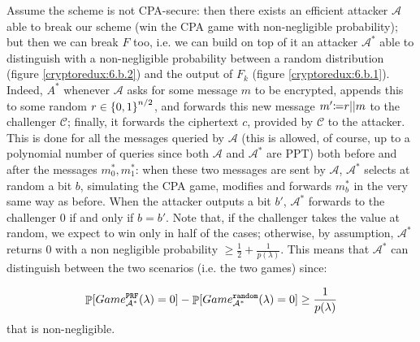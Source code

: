 \begin{enumerate}[(a)]
\begin{solution}
		      Assume the scheme is not CPA-secure: then there exists an efficient attacker $\mathcal{A}$ able to break our scheme (win the CPA game with non-negligible probability); but then we can break $F$ too, i.e. we can build on top of it an attacker $\mathcal{A}^*$ able to distinguish with a non-negligible probability between a random distribution (figure \ref{cryptoredux:6.b.2}) and the output of $F_k$ (figure \ref{cryptoredux:6.b.1}). Indeed, $A^*$ whenever $\mathcal{A}$ asks for some message $m$ to be encrypted, appends this to some random $r \in \bits^{n/2}$, and forwards this new message $m'\deq r||m$ to the challenger $\mathcal{C}$; finally, it forwards the ciphertext $c$, provided by $\mathcal{C}$ to the attacker. This is done for all the messages queried by $\mathcal{A}$ (this is allowed, of course, up to a polynomial number of queries since both $\mathcal{A}$ and $\mathcal{A}^*$ are PPT) both before and after the messages $m_0^*, m_1^*$: when these two messages are sent by $\mathcal{A}$, $\mathcal{A}^*$ selects at random a bit $b$, simulating the CPA game, modifies and forwards $m_b^*$ in the very same way as before. When the attacker outputs a bit $b'$, $\mathcal{A}^*$ forwards to the challenger 0 if and only if $b = b'$. Note that, if the challenger takes the value at random, we expect to win only in half of the cases; otherwise, by assumption, $\mathcal{A}^*$ returns 0 with a non negligible probability $\ge \frac{1}{2} + \frac{1}{p(\lambda)}$. This means that $\mathcal{A}^*$ can distinguish between the two scenarios (i.e. the two games) since:

		      \[\P[Game_{\mathcal{A}^*}^{\texttt{PRF}}(\lambda) = 0] - \P[Game_{\mathcal{A}^*}^{\texttt{random}}(\lambda) = 0] \ge \frac{1}{p(\lambda)}\]
		      that is non-negligible.
	      \end{solution}
\end{enumerate}